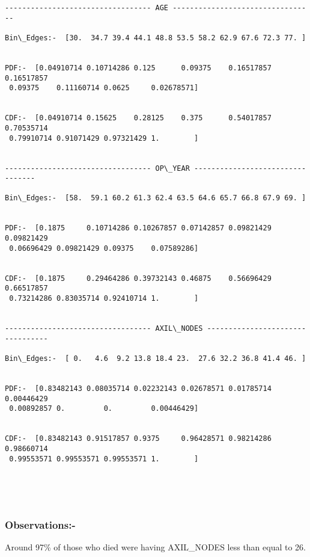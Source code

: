 \documentclass[11pt]{article}
\begin{document}
    \begin{Verbatim}[commandchars=\\\{\}]
---------------------------------- AGE ---------------------------------

Bin\_Edges:-  [30.  34.7 39.4 44.1 48.8 53.5 58.2 62.9 67.6 72.3 77. ]


PDF:-  [0.04910714 0.10714286 0.125      0.09375    0.16517857 0.16517857
 0.09375    0.11160714 0.0625     0.02678571]


CDF:-  [0.04910714 0.15625    0.28125    0.375      0.54017857 0.70535714
 0.79910714 0.91071429 0.97321429 1.        ]


---------------------------------- OP\_YEAR ---------------------------------

Bin\_Edges:-  [58.  59.1 60.2 61.3 62.4 63.5 64.6 65.7 66.8 67.9 69. ]


PDF:-  [0.1875     0.10714286 0.10267857 0.07142857 0.09821429 0.09821429
 0.06696429 0.09821429 0.09375    0.07589286]


CDF:-  [0.1875     0.29464286 0.39732143 0.46875    0.56696429 0.66517857
 0.73214286 0.83035714 0.92410714 1.        ]


---------------------------------- AXIL\_NODES ---------------------------------

Bin\_Edges:-  [ 0.   4.6  9.2 13.8 18.4 23.  27.6 32.2 36.8 41.4 46. ]


PDF:-  [0.83482143 0.08035714 0.02232143 0.02678571 0.01785714 0.00446429
 0.00892857 0.         0.         0.00446429]


CDF:-  [0.83482143 0.91517857 0.9375     0.96428571 0.98214286 0.98660714
 0.99553571 0.99553571 0.99553571 1.        ]



    \end{Verbatim}

    \begin{center}
    \end{center}
    { \hspace*{\fill} \\}
    
    \subsubsection{Observations:-}\label{observations-}

Around 97\% of those who died were having AXIL\_NODES less than equal to
26.
\end{document}
